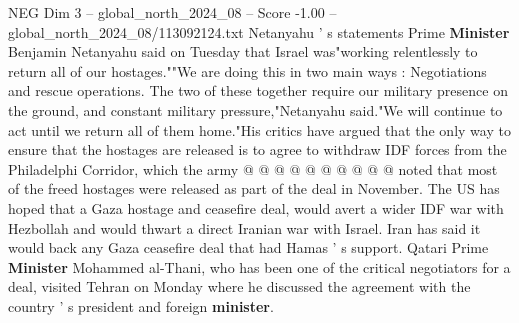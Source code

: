 \begin{textsample}{NEG Dim 3 – global\_north\_2024\_08 – Score -1.00 – global\_north\_2024\_08/113092124.txt}
Netanyahu ' s statements Prime \textbf{Minister} Benjamin Netanyahu said on Tuesday that Israel was"working relentlessly to return all of our hostages.""We are doing this in two main ways : Negotiations and rescue operations.
The two of these together require our military presence on the ground, and constant military pressure,"Netanyahu said."We will continue to act until we return all of them home."His critics have argued that the only way to ensure that the hostages are released is to agree to withdraw IDF forces from the Philadelphi Corridor, which the army @ @ @ @ @ @ @ @ @ @ noted that most of the freed hostages were released as part of the deal in November.
The US has hoped that a Gaza hostage and ceasefire deal, would avert a wider IDF war with Hezbollah and would thwart a direct Iranian war with Israel.
Iran has said it would back any Gaza ceasefire deal that had Hamas ' s support.
Qatari Prime \textbf{Minister} Mohammed al-Thani, who has been one of the critical negotiators for a deal, visited Tehran on Monday where he discussed the agreement with the country ' s president and foreign \textbf{minister}.

\end{textsample}
